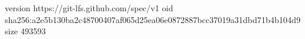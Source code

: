 version https://git-lfs.github.com/spec/v1
oid sha256:a2e5b130ba2c48700407af065d25ea06e0872887bcc37019a31dbd71b4b104d9
size 493593
